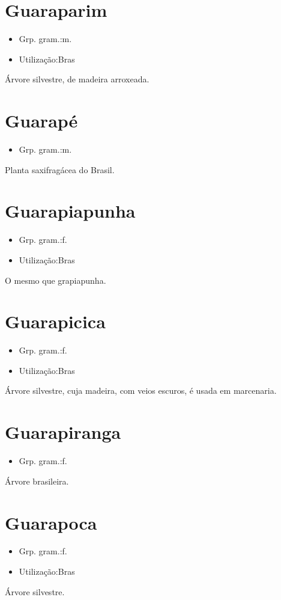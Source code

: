 \section{Guaraparim}
\begin{itemize}
\item {Grp. gram.:m.}
\end{itemize}
\begin{itemize}
\item {Utilização:Bras}
\end{itemize}
Árvore silvestre, de madeira arroxeada.
\section{Guarapé}
\begin{itemize}
\item {Grp. gram.:m.}
\end{itemize}
Planta saxifragácea do Brasil.
\section{Guarapiapunha}
\begin{itemize}
\item {Grp. gram.:f.}
\end{itemize}
\begin{itemize}
\item {Utilização:Bras}
\end{itemize}
O mesmo que \textunderscore grapiapunha\textunderscore .
\section{Guarapicica}
\begin{itemize}
\item {Grp. gram.:f.}
\end{itemize}
\begin{itemize}
\item {Utilização:Bras}
\end{itemize}
Árvore silvestre, cuja madeira, com veios escuros, é usada em marcenaria.
\section{Guarapiranga}
\begin{itemize}
\item {Grp. gram.:f.}
\end{itemize}
Árvore brasileira.
\section{Guarapoca}
\begin{itemize}
\item {Grp. gram.:f.}
\end{itemize}
\begin{itemize}
\item {Utilização:Bras}
\end{itemize}
Árvore silvestre.
